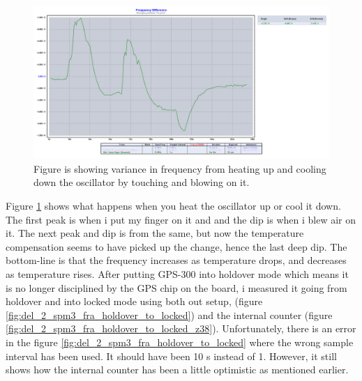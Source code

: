 \documentclass[11pt,english,a4paper]{article}
\begin{document}
\begin{figure}[!htb]
  \centering
    \includegraphics[width=1\textwidth]{del_2_spm2_fbtb_blaas_finger.png}
      \caption{Figure is showing variance in frequency from heating up and cooling down the oscillator by touching and blowing on it.}
          \label{fig:del_2_spm2_fbtb_blaas_finger}
\end{figure}

Figure \ref{fig:del_2_spm2_fbtb_blaas_finger} shows what happens when you heat the oscillator up or cool it down. The first peak is when i put my finger on it and and the dip is when i blew air on it. The next peak and dip is from the same, but now the temperature compensation seems to have picked up the change, hence the last deep dip. The bottom-line is that the frequency increases as temperature drops, and decreases as temperature rises. 
After putting GPS-300 into holdover mode which means it is no longer disciplined by the GPS chip on the board, i measured it going from holdover and into locked mode using both out setup, (figure \ref{fig:del_2_spm3_fra_holdover_to_locked}) and the internal counter (figure \ref{fig:del_2_spm3_fra_holdover_to_locked_z38}). Unfortunately, there is an error in the figure \ref{fig:del_2_spm3_fra_holdover_to_locked} where the wrong sample interval has been used. It should have been 10 s instead of 1. However, it still shows how the internal counter has been a little optimistic as mentioned earlier. 
\end{document}
